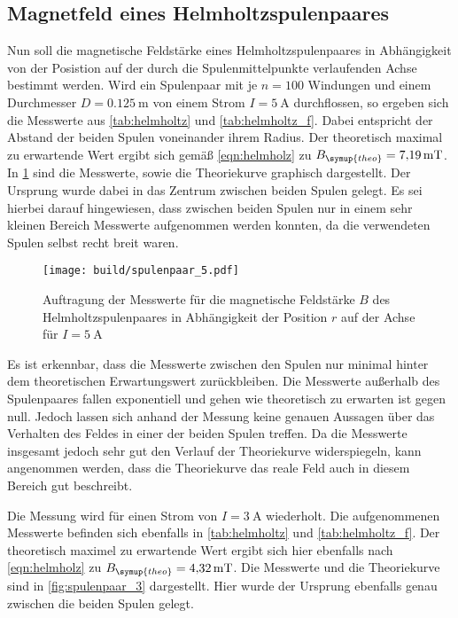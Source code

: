 \newpage
\subsection{Magnetfeld eines Helmholtzspulenpaares}

Nun soll die magnetische Feldstärke eines Helmholtzspulenpaares in Abhängigkeit von
der Posistion auf der durch die Spulenmittelpunkte verlaufenden Achse bestimmt werden.
Wird ein Spulenpaar mit je $n=100$ Windungen und einem Durchmesser $D=\SI{0,125}{\metre}$
von einem Strom $I=\SI{5}{\ampere}$ durchflossen, so ergeben sich die Messwerte aus \ref{tab:helmholtz}
und \ref{tab:helmholtz_f}.
Dabei entspricht der Abstand der beiden Spulen voneinander ihrem Radius.
Der theoretisch maximal zu erwartende Wert ergibt sich gemäß \ref{eqn:helmholz} zu $B_{\symup{theo}}=\SI{7,19}{\milli\tesla}$. In
\ref{fig:spulenpaar_5} sind die Messwerte, sowie die Theoriekurve graphisch dargestellt. Der Ursprung wurde
dabei in das Zentrum zwischen beiden Spulen gelegt. Es sei hierbei darauf
hingewiesen, dass zwischen beiden Spulen nur in einem sehr kleinen Bereich Messwerte
aufgenommen werden konnten, da die verwendeten Spulen selbst recht breit waren.

\begin{figure}
  \centering
  \texttt{[image: build/spulenpaar\_5.pdf]}
  \caption{Auftragung der Messwerte für die magnetische Feldstärke $B$ des Helmholtzspulenpaares
  in Abhängigkeit der Position $r$ auf der Achse für $I=\SI{5}{\ampere}$}
  \label{fig:spulenpaar_5}
\end{figure}

Es ist erkennbar, dass die Messwerte zwischen den Spulen nur minimal hinter dem theoretischen Erwartungswert
zurückbleiben. Die Messwerte außerhalb des Spulenpaares fallen exponentiell und gehen
wie theoretisch zu erwarten ist gegen null. Jedoch lassen sich anhand der Messung keine
genauen Aussagen über das Verhalten des Feldes in einer der beiden Spulen treffen.
Da die Messwerte insgesamt jedoch sehr gut den Verlauf der Theoriekurve widerspiegeln,
kann angenommen werden, dass die Theoriekurve das reale Feld auch in diesem Bereich gut beschreibt.


Die Messung wird für einen Strom von $I=\SI{3}{\ampere}$ wiederholt. Die aufgenommenen Messwerte
befinden sich ebenfalls in \ref{tab:helmholtz} und \ref{tab:helmholtz_f}. Der theoretisch maximel zu
erwartende Wert ergibt sich hier ebenfalls nach \ref{eqn:helmholz} zu $B_{\symup{theo}}=\SI{4,32}{\milli\tesla}$. Die Messwerte
und die Theoriekurve sind in \ref{fig:spulenpaar_3} dargestellt. Hier wurde der Ursprung ebenfalls genau
zwischen die beiden Spulen gelegt.

